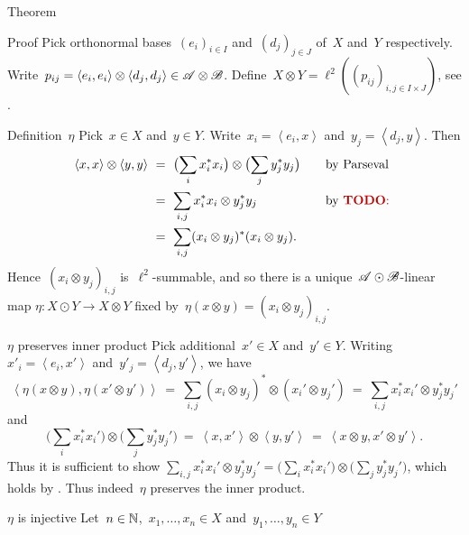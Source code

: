 \documentclass[b]{subfiles}
\begin{document}
\begin{parsec}
\begin{point}{Theorem}
\begin{enumerate}
\end{enumerate}
\begin{point}{Proof}%
Pick orthonormal bases~$(e_i)_{i \in I}$ and~$(d_j)_{j \in J}$ of~$X$
    and~$Y$ respectively.
Write~$p_{ij} = \left<e_i, e_i\right>\otimes \left<d_j,d_j\right>
    \in \mathscr{A} \otimes \mathscr{B}$.
Define~$X \otimes Y = \ell^2((p_{ij})_{i,j \in I\times J})$,
    see .
\begin{point}{Definition~$\eta$}%
Pick~$x \in X$ and~$y \in Y$.
Write~$x_i = \left<e_i, x\right>$
and~$y_j = \left<d_j, y\right>$.
Then
\begin{align*}
    \left<x,x\right> \otimes \left<y,y\right>
    &\ = \ \bigl( \sum_i x_i^*x_i\bigr) \otimes\bigl(\sum_jy_j^*y_j\bigr)
            &\quad&\text{by Parseval}  \\
            &\ = \ \sum_{i,j}  x_i^*x_i  \otimes y_j^*y_j  &&\text{by \TODO{}}\\
            &\ = \ \sum_{i,j}  (x_i \otimes y_j)^* (x_i  \otimes y_j).
\end{align*}
Hence~$(x_i \otimes y_j)_{i,j}$ is~$\ell^2$-summable,
    and so there is a unique~$\mathscr{A} \odot\mathscr{B}$-linear map
    $\eta\colon X \odot Y \to X \otimes Y$ fixed
    by~$\eta(x \otimes y) = (x_i \otimes y_j)_{i,j}$.
\end{point}
\begin{point}{$\eta$ preserves inner product}%
Pick additional~$x' \in X$ and~$y' \in Y$.
Writing~$x'_i = \left<e_i,x'\right>$
    and~$y'_j = \left<d_j, y'\right>$,
we have
\begin{equation*}
    \left<\eta(x\otimes y), \eta(x' \otimes y')\right>
    \ = \ \sum_{i,j} (x_i\otimes y_j)^* \otimes (x_i' \otimes y_j')
    \ = \ \sum_{i,j} x_i^*x_i' \otimes y_j^* y_j'
\end{equation*}
and
\begin{equation*}
    \bigl(\sum_i x_i^*x_i'\bigr) \otimes \bigl( \sum_j y_j^* y_j' \bigr)
    \ = \ \left<x,x'\right> \otimes \left<y,y'\right>
    \ = \ \left<x\otimes y,x' \otimes y'\right> .
\end{equation*}
Thus it is sufficient to show
$\sum_{i,j} x_i^*x_i' \otimes y_j^* y_j'
    = \bigl(\sum_i x_i^*x_i'\bigr) \otimes \bigl( \sum_j y_j^* y_j' \bigr)$,
    which holds by \TODO{}.
Thus indeed~$\eta$ preserves the inner product.
\end{point}
\begin{point}{$\eta$ is injective}%
Let~$n \in \mathbb{N}$,~$x_1, \ldots, x_n \in X$
    and~$y_1,\ldots, y_n \in Y$

\end{point}
\end{point}
\end{point}
\end{parsec}
\end{document}
